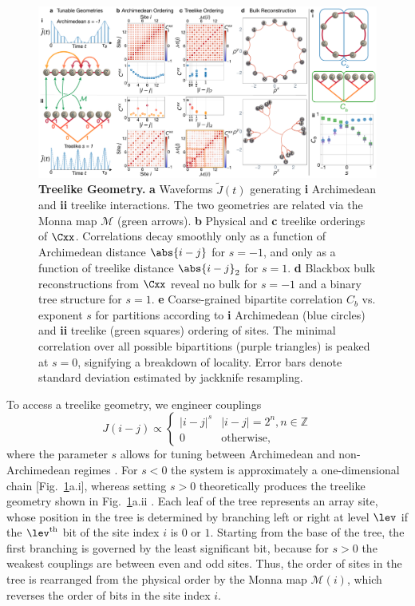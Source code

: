 \documentclass[aps,pra,superscriptaddress,12pt]{revtex4-1} %
\begin{document}
\begin{bibunit}
\begin{figure}[tbh]
\includegraphics[width=\textwidth]{Figures/Figure4.pdf}
\caption{\textbf{Treelike Geometry.} \textbf{a} Waveforms $\tilde{J}(t)$ generating \textbf{i} Archimedean and \textbf{ii} treelike interactions.  The two geometries are related via the Monna map $\mathcal{M}$ (green arrows). \textbf{b} Physical and \textbf{c} treelike orderings of $\Cxx$.  Correlations decay smoothly only as a function of Archimedean distance $\abs{i-j}$ for $s = -1$, and only as a function of treelike distance $\abs{i-j}_2$ for $s = 1$.  \textbf{d} Blackbox bulk reconstructions from $\Cxx$ reveal no bulk for $s = -1$ and a binary tree structure for $s = 1$. \textbf{e} Coarse-grained bipartite correlation $C_b$ vs. exponent $s$ for partitions according to \textbf{i} Archimedean (blue circles) and \textbf{ii} treelike (green squares) ordering of sites. The minimal correlation over all possible bipartitions (purple triangles) is peaked at $s = 0$, signifying a breakdown of locality. Error bars denote standard deviation estimated by jackknife resampling. }
\label{fig:trees}
\end{figure}

To access a treelike geometry, we engineer couplings
\begin{equation}\label{eq:tree_couplings}
  J(i - j) \propto 
  \begin{cases}
    |i - j|^s & |i - j| = 2^n, n\in \mathbb{Z}\\
    0 & \mathrm{otherwise},
  \end{cases}
\end{equation}
where the parameter $s$ allows for tuning between Archimedean and non-Archimedean regimes \cite{bentsen2019treelike}.  For $s < 0$ the system is approximately a one-dimensional chain [Fig.~\ref{fig:trees}a.i], whereas setting $s>0$ theoretically produces the treelike geometry shown in Fig.~\ref{fig:trees}a.ii \cite{gubser2018continuum, bentsen2019treelike}.  Each leaf of the tree represents an array site, whose position in the tree is determined by branching left or right at level $\lev$ if the $\lev^\mathrm{th}$ bit of the site index $i$ is $0$ or $1$.  Starting from the base of the tree, the first branching is governed by the least significant bit, because for $s>0$ the weakest couplings are between even and odd sites.  Thus, the order of sites in the tree is rearranged from the physical order by the Monna map $\mathcal{M}(i)$, which reverses the order of bits in the site index $i$.


\end{bibunit}
\end{document}
